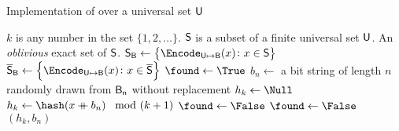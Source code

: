 \documentclass[ ../main.tex]{subfiles}
\begin{document}
\begin{algorithm}
    \caption{Implementation of \protect\MakeSingularHashSet over a universal 
    set $\Set{U}$}
    \label{alg:makeexactobset}
    \DontPrintSemicolon
    \KwParam
    {
        $k$ is any number in the set $\{1,2,\ldots\}$.
    }
    \KwIn
    {
        $\Set{S}$ is a subset of a finite universal set $\Set{U}$.
    }
    \KwOut
    {
        An \emph{oblivious} exact set of $\Set{S}$.
    }
    {
        $\Set{S}_{\Set{B}} \gets \left\{\Encode_{\Set{U} \mapsto \Set{B}}(x) \colon x \in \Set{S}\right\}$\;
        $\Set{\overline{S}}_{\Set{B}} \gets \left\{\Encode_{\Set{U} \mapsto \Set{B}}(x) \colon x \in \Set{\overline{S}}\right\}$\;        
        {
            {
                $\found \gets \True$\;
                $b_n \gets $ a bit string of length $n$ randomly drawn from $\Set{B}[n]$ without replacement\;
                $h_k \gets \Null$\;
                {
                    {
                        $h_k \gets \hash\!\left(x \catop b_n\right) \mod (k+1)$\;
                    }
                    {
                        $\found \gets \False$\;
                    }
                }
                {
                    {
                        $\found \gets \False$\;
                    }
                }
                \If{\found}
                {
                    \Return $(h_k, b_n)$\;
                }
            }
        }
    }
\end{algorithm}



\end{document}
